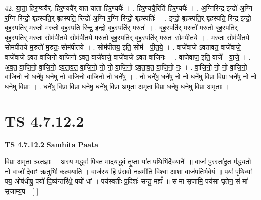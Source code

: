 \documentclass[17pt]{extarticle}
\begin{document}
42. या॒ता॒ हि॒र॒ण्ययैर्॑. हिर॒ण्ययै᳚र् यात याता हिर॒ण्ययैः᳚ । . हि॒र॒ण्ययै॒रिति॑ हिर॒ण्ययैः᳚ । . अ॒ग्निरिन्द्र॒ इन्द्रो॑ अ॒ग्नि र॒ग्नि रिन्द्रो॒ बृह॒स्पति॒र् बृह॒स्पति॒ रिन्द्रो॑ अ॒ग्नि र॒ग्नि रिन्द्रो॒ बृह॒स्पतिः॑ । . इन्द्रो॒ बृह॒स्पति॒र् बृह॒स्पति॒ रिन्द्र॒ इन्द्रो॒ बृह॒स्पति॑र् म॒रुतो॑ म॒रुतो॒ बृह॒स्पति॒ रिन्द्र॒ इन्द्रो॒ बृह॒स्पति॑र् म॒रुतः॑ । . बृह॒स्पति॑र् म॒रुतो॑ म॒रुतो॒ बृह॒स्पति॒र् बृह॒स्पति॑र् म॒रुतः॒ सोम॑पीतये॒ सोम॑पीतये म॒रुतो॒ बृह॒स्पति॒र् बृह॒स्पति॑र् म॒रुतः॒ सोम॑पीतये । . म॒रुतः॒ सोम॑पीतये॒ सोम॑पीतये म॒रुतो॑ म॒रुतः॒ सोम॑पीतये । . सोम॑पीतय॒ इति॒ सोम॑ - पी॒त॒ये॒ । . वाजे॑वाजे ऽवतावत॒ वाजे॑वाजे॒ वाजे॑वाजे ऽवत वाजिनो वाजिनो ऽवत॒ वाजे॑वाजे॒ वाजे॑वाजे ऽवत वाजिनः । . वाजे॑वाज॒ इति॒ वाजे᳚ - वा॒जे॒ । . अ॒व॒त॒ वा॒जि॒नो॒ वा॒जि॒नो॒ ऽव॒ता॒व॒त॒ वा॒जि॒नो॒ नो॒ नो॒ वा॒जि॒नो॒ ऽव॒ता॒व॒त॒ वा॒जि॒नो॒ नः॒ । . वा॒जि॒नो॒ नो॒ नो॒ वा॒जि॒नो॒ वा॒जि॒नो॒ नो॒ धने॑षु॒ धने॑षु नो वाजिनो वाजिनो नो॒ धने॑षु । . नो॒ धने॑षु॒ धने॑षु नो नो॒ धने॑षु विप्रा विप्रा॒ धने॑षु नो नो॒ धने॑षु विप्राः । . धने॑षु विप्रा विप्रा॒ धने॑षु॒ धने॑षु विप्रा अमृता अमृता विप्रा॒ धने॑षु॒ धने॑षु विप्रा अमृताः । \newline
\pagebreak
{}

\section{ TS 4.7.12.2 }

\textbf{TS 4.7.12.2 } \newline
\textbf{Samhita Paata} \newline

विप्रा अमृता ऋतज्ञाः । अ॒स्य मद्ध्वः॑ पिबत मा॒दय॑द्ध्वं तृ॒प्ता या॑त प॒थिभि॑र्देव॒यानैः᳚ ॥ वाजः॑ पु॒रस्ता॑दु॒त म॑द्ध्य॒तो नो॒ वाजो॑ दे॒वाꣳ ऋ॒तुभिः॑ कल्पयाति । वाज॑स्य॒ हि प्र॑स॒वो नन्न॑मीति॒ विश्वा॒ आशा॒ वाज॑पतिर्भवेयं ॥ पयः॑ पृथि॒व्यां पय॒ ओष॑धीषु॒ पयो॑ दि॒व्य॑न्तरि॑क्षे॒ पयो॑ धां । पय॑स्वतीः प्र॒दिशः॑ सन्तु॒ मह्यं᳚ ॥ सं मा॑ सृजामि॒ पय॑सा घृ॒तेन॒ सं मा॑ सृजाम्य॒प - [  ] \newline
\end{document}
